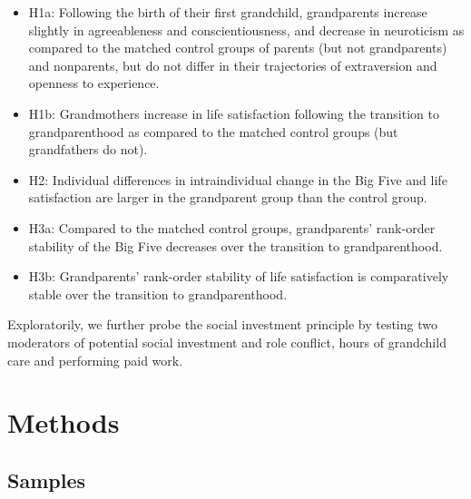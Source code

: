 \documentclass[
  english,
  man, noextraspace]{apa7}
\providecommand{\tightlist}{%
  \setlength{\itemsep}{0pt}\setlength{\parskip}{0pt}}
\begin{document}
\begin{itemize}
\tightlist
\item
  H1a: Following the birth of their first grandchild, grandparents increase slightly in agreeableness and conscientiousness, and decrease in neuroticism as compared to the matched control groups of parents (but not grandparents) and nonparents, but do not differ in their trajectories of extraversion and openness to experience.
\item
  H1b: Grandmothers increase in life satisfaction following the transition to grandparenthood as compared to the matched control groups (but grandfathers do not).
\item
  H2: Individual differences in intraindividual change in the Big Five and life satisfaction are larger in the grandparent group than the control group.
\item
  H3a: Compared to the matched control groups, grandparents' rank-order stability of the Big Five decreases over the transition to grandparenthood.
\item
  H3b: Grandparents' rank-order stability of life satisfaction is comparatively stable over the transition to grandparenthood.
\end{itemize}

Exploratorily, we further probe the social investment principle by testing two moderators of potential social investment and role conflict, hours of grandchild care and performing paid work.

\hypertarget{methods}{%
\section{Methods}\label{methods}}

\hypertarget{samples}{%
\subsection{Samples}\label{samples}}
\end{document}
